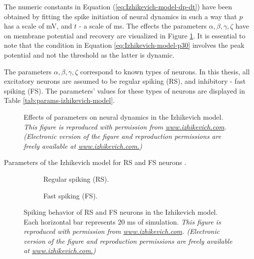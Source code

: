 The numeric constants in Equation (\ref{eq:Izhikevich-model-dp-dt}) have been obtained by fitting the spike initiation of neural dynamics in such a way that $p$ has a scale of mV, and $t$ - a scale of ms.
The effects the parameters $\alpha, \beta, \gamma, \zeta$ have on membrane potential and recovery are visualized in Figure \ref{fig:neural-dynamics}. It is essential to note that the condition in Equation \ref{eq:Izhikevich-model-p30} involves the peak potential and not the threshold as the latter is dynamic. 

The parameters $\alpha, \beta, \gamma, \zeta$ correspond to known types of neurons. In this thesis, all excitatory neurons are assumed to be regular spiking (RS), and inhibitory - fast spiking (FS). 
The parameters' values for these types of neurons  are displayed in Table \ref{tab:params-izhikevich-model}.

\begin{figure}[!htp]
    \centering
    
    \caption[Effects of parameters on neural dynamics, Izhikevich model]{Effects of parameters on neural dynamics in the Izhikevich model. {\it This figure is reproduced with permission from \url{www.izhikevich.com}. (Electronic version of the figure and reproduction permissions are freely available at \url{www.izhikevich.com.})}}
    \label{fig:neural-dynamics}
\end{figure}

\begin{table}[!htp] 
    \centering
    
    \caption[Parameters for RS and FS neurons, Izhikevich model]{Parameters of the Izhikevich model for RS and FS neurons \cite{Izhikevich2003}.}
\label{tab:params-izhikevich-model}
\end{table}


\begin{figure}[!htp]
    \hspace*{-1.5cm} 
    \centering
    \begin{subfigure}[t]{0.3\textwidth}
        \centering
        
        \caption{Regular spiking (RS).}
        \label{fig:neuron-types-rs}
    \end{subfigure}
    \hspace{0.1\textwidth}
    \begin{subfigure}[t]{0.3\textwidth}
        \centering
        
        \caption{Fast spiking (FS).}
        \label{fig:neuron-types-fs}
    \end{subfigure}
    \caption[RS and FS neurons, Izhikevich model]{Spiking behavior of RS and FS neurons in the Izhikevich model. Each horizontal bar represents 20 ms of simulation. {\it This figure is reproduced with permission from \url{www.izhikevich.com}. (Electronic version of the figure and reproduction permissions are freely available at \url{www.izhikevich.com.})}}
    \label{fig:neuron-types}
\end{figure}

